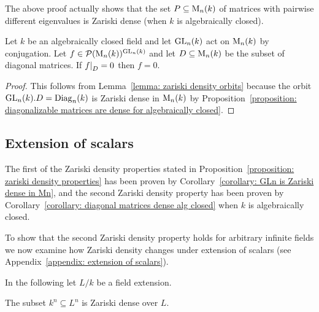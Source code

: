 \begin{remark}
  The above proof actually shows that the set $P \subseteq \operatorname{M}_n(k)$ of matrices with pairwise different eigenvalues is Zariski dense (when $k$ is algebraically closed).
\end{remark}


\begin{corollary}
  \label{corollary: diagonal matrices dense alg closed}
  Let $k$ be an algebraically closed field and let $\operatorname{GL}_n(k)$ act on $\operatorname{M}_n(k)$ by conjugation.
  Let $f \in \mathcal{P}(\operatorname{M}_n(k))^{\operatorname{GL}_n(k)}$ and let $D \subseteq \operatorname{M}_n(k)$ be the subset of diagonal matrices.
  If $\restrict{f}{D} = 0$ then $f = 0$.
\end{corollary}
\begin{proof}
  This follows from Lemma~\ref{lemma: zariski density orbits} because the orbit $\operatorname{GL}_n(k).D = \operatorname{Diag}_n(k)$ is Zariski dense in $\operatorname{M}_n(k)$ by Proposition~\ref{proposition: diagonalizable matrices are dense for algebraically closed}.
\end{proof}





\subsection*{Extension of scalars}


\begin{fluff}
  The first of the Zariski density properties stated in Proposition~\ref{proposition: zariski density properties} has been proven by Corollary~\ref{corollary: GLn is Zariski dense in Mn}, and the second Zariski density property has been proven by Corollary~\ref{corollary: diagonal matrices dense alg closed} when $k$ is algebraically closed.
  
  To show that the second Zariski density property holds for arbitrary infinite fields we now examine how Zariski density changes under extension of scalars (see Appendix~\ref{appendix: extension of scalars}).
  
  In the following let $L/k$ be a field extension.
\end{fluff}


\begin{lemma}
\label{lemma: kn is Zariski dense in Ln}
  The subset $k^n \subseteq L^n$ is Zariski dense over $L$.
\end{lemma}


